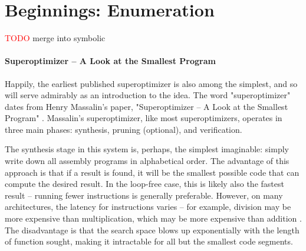 \documentclass[12pt,twoside]{reedthesis}
\newcommand{\red}[1]{\textcolor{red}{#1}}
\newcommand{\addressed}[2]{{#1}}
\begin{document}

\chapter{Beginnings: Enumeration}
\red{TODO} merge into symbolic

\subsubsection{Superoptimizer -- A Look at the Smallest Program}
Happily, the earliest published superoptimizer is also among the simplest, and so will serve admirably as an
    \addressed{introduction to the idea}{at some point you should lay out a more complete/formal problem statement. You can use this first paper to do this but then I would talk about it earlier, in the introduction}. 
The word "superoptimizer" dates from Henry Massalin's paper, "Superoptimizer -- A Look at the Smallest Program" \cite{massalin1987superoptimizer}.
Massalin's superoptimizer, like most superoptimizers, operates in three main phases: synthesis, pruning (optional), and verification.
    
The synthesis stage in this system is, perhaps, the simplest imaginable: simply write down all assembly programs in alphabetical order.
The advantage of this approach is that if a result is found, it will be the smallest possible code that can compute the desired result.
In the loop-free case, this is likely also the fastest result -- running fewer instructions is generally preferable.
However, on many architectures, the latency for instructions varies -- for example, division may be more expensive than multiplication, which may be more expensive than addition \cite{fog1996instructiontables}.
The disadvantage is that the search space blows up exponentially with the length of function sought, making it intractable for all but the smallest code segments.
    
\end{document}
